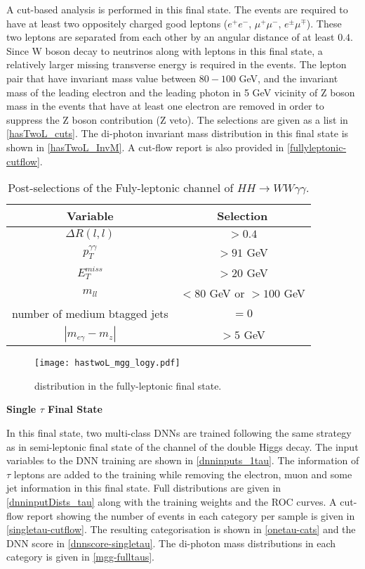 {A cut-based analysis is performed in this final state. The events are required to have at least two oppositely charged good leptons ($e^+e^-$, $\mu^+\mu^-$, $e^\pm\mu^\mp$). These two leptons are separated from each other by an angular distance of at least $0.4$. Since W boson decay to neutrinos along with leptons in this final state, a relatively larger missing transverse energy is required in the events. The lepton pair that have invariant mass value between $80-100$ GeV, and the invariant mass of the leading electron and the leading photon in 5 GeV vicinity of Z boson mass in the events that have at least one electron are removed in order to suppress the Z boson contribution (Z veto). The selections are given as a list in \autoref{hasTwoL_cuts}. The di-photon invariant mass distribution in this final state is shown in \autoref{hasTwoL_InvM}. A cut-flow report is also provided in \autoref{fullyleptonic-cutflow}.

\begin{table}[h]
    \centering
        \caption{Post-selections of the Fuly-leptonic channel of $HH\rightarrow{WW\gamma\gamma}$.}
        \begin{tabular}{c|c}
            Variable & Selection \\ \hline
            $\Delta R(l,l)$ & $> 0.4$ \\
            $p_T^{\gamma\gamma} $ & $> 91 $ GeV \\
            $E_T^{miss}$ & $> 20 $ GeV \\
            $m_{ll}$ & $<80$ GeV or $>100 $ GeV \\
            number of medium btagged jets & $ = 0 $ \\
            $|m_{e\gamma} - m_{z}|$ & $ > 5 $ GeV \\
        \end{tabular}
    \label{hasTwoL_cuts}
\end{table}

\begin{figure}[h!]
    \centering
	\texttt{[image: hastwoL\_mgg\_logy.pdf]}
	\vspace{2mm}
	\caption{\mgg distribution in the fully-leptonic final state.}
	\label{hasTwoL_InvM}
\end{figure}

\textbf{Single $\tau$ Final State}

In this final state, two multi-class DNNs are trained following the same strategy as in semi-leptonic final state of the \wwgg channel of the double Higgs decay. The input variables to the DNN training are shown in \autoref{dnninputs_1tau}. The information of $\tau$ leptons are added to the training while removing the electron, muon and some jet information in this final state. Full distributions are given in \autoref{dnninputDists_tau} along with the training weights and the ROC curves. A cut-flow report showing the number of events in each category per sample is given in \autoref{singletau-cutflow}. The resulting categorisation is shown in \autoref{onetau-cats} and the DNN score in \autoref{dnnscore-singletau}. The di-photon mass distributions in each category is given in \autoref{mgg-fulltaus}.

}

